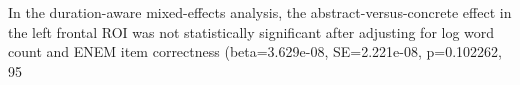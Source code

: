 In the duration-aware mixed-effects analysis, the abstract-versus-concrete effect in the left frontal ROI was not statistically significant after adjusting for log word count and ENEM item correctness (beta=3.629e-08, SE=2.221e-08, p=0.102262, 95%

